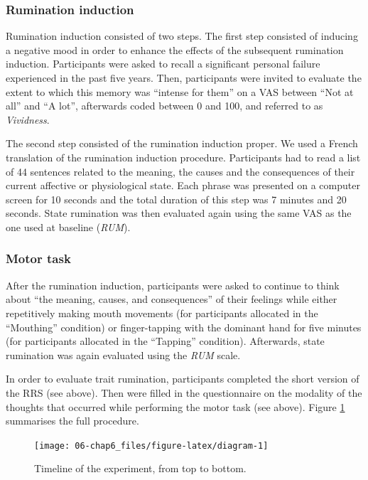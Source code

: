 \documentclass[12pt,]{book}
\theoremstyle{definition}
\theoremstyle{definition}
\theoremstyle{definition}
\theoremstyle{remark}
\begin{document}
\subsubsection{Rumination induction}\label{rumination-induction}

Rumination induction consisted of two steps. The first step consisted of
inducing a negative mood in order to enhance the effects of the
subsequent rumination induction. Participants were asked to recall a
significant personal failure experienced in the past five years. Then,
participants were invited to evaluate the extent to which this memory
was ``intense for them'' on a VAS between ``Not at all'' and ``A lot'',
afterwards coded between 0 and 100, and referred to as \emph{Vividness}.

The second step consisted of the rumination induction proper. We used a
French translation of the \citet{Nolen-hoeksema1993} rumination
induction procedure. Participants had to read a list of 44 sentences
related to the meaning, the causes and the consequences of their current
affective or physiological state. Each phrase was presented on a
computer screen for 10 seconds and the total duration of this step was 7
minutes and 20 seconds. State rumination was then evaluated again using
the same VAS as the one used at baseline (\emph{RUM}).

\subsubsection{Motor task}\label{proc_supp}

After the rumination induction, participants were asked to continue to
think about ``the meaning, causes, and consequences'' of their feelings
while either repetitively making mouth movements (for participants
allocated in the ``Mouthing'' condition) or finger-tapping with the
dominant hand for five minutes (for participants allocated in the
``Tapping'' condition). Afterwards, state rumination was again evaluated
using the \emph{RUM} scale.

In order to evaluate trait rumination, participants completed the short
version of the RRS (see above). Then were filled in the questionnaire on
the modality of the thoughts that occurred while performing the motor
task (see above). Figure \ref{fig:diagram} summarises the full
procedure.

\begin{figure}[H]

{\centering \texttt{[image: 06-chap6\_files/figure-latex/diagram-1]} 

}

\caption{Timeline of the experiment, from top to bottom.}\label{fig:diagram}
\end{figure}
\end{document}
